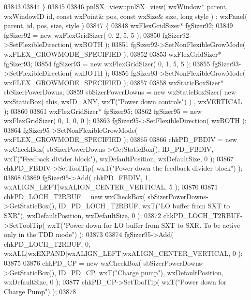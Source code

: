 \begin{DoxyCode}
03843     
03844 \}
03845 
03846 pnlSX_view::pnlSX_view( wxWindow* parent, wxWindowID \textcolor{keywordtype}{id}, \textcolor{keyword}{const} wxPoint& pos, \textcolor{keyword}{const} wxSize& 
      size, \textcolor{keywordtype}{long} style ) : wxPanel( parent, id, pos, size, style )
03847 \{
03848     wxFlexGridSizer* fgSizer92;
03849     fgSizer92 = \textcolor{keyword}{new} wxFlexGridSizer( 0, 2, 5, 5 );
03850     fgSizer92->SetFlexibleDirection( wxBOTH );
03851     fgSizer92->SetNonFlexibleGrowMode( wxFLEX\_GROWMODE\_SPECIFIED );
03852     
03853     wxFlexGridSizer* fgSizer93;
03854     fgSizer93 = \textcolor{keyword}{new} wxFlexGridSizer( 0, 1, 5, 5 );
03855     fgSizer93->SetFlexibleDirection( wxBOTH );
03856     fgSizer93->SetNonFlexibleGrowMode( wxFLEX\_GROWMODE\_SPECIFIED );
03857     
03858     wxStaticBoxSizer* sbSizerPowerDowns;
03859     sbSizerPowerDowns = \textcolor{keyword}{new} wxStaticBoxSizer( \textcolor{keyword}{new} wxStaticBox( \textcolor{keyword}{this}, wxID\_ANY, wxT(\textcolor{stringliteral}{"Power down controls"}) )
      , wxVERTICAL );
03860     
03861     wxFlexGridSizer* fgSizer95;
03862     fgSizer95 = \textcolor{keyword}{new} wxFlexGridSizer( 0, 1, 0, 0 );
03863     fgSizer95->SetFlexibleDirection( wxBOTH );
03864     fgSizer95->SetNonFlexibleGrowMode( wxFLEX\_GROWMODE\_SPECIFIED );
03865     
03866     chkPD_FBDIV = \textcolor{keyword}{new} wxCheckBox( sbSizerPowerDowns->GetStaticBox(), ID_PD_FBDIV, wxT(\textcolor{stringliteral}{"Feedback divider
       block"}), wxDefaultPosition, wxDefaultSize, 0 );
03867     chkPD_FBDIV->SetToolTip( wxT(\textcolor{stringliteral}{"Power down the feedback divider block"}) );
03868     
03869     fgSizer95->Add( chkPD_FBDIV, 1, wxALIGN\_LEFT|wxALIGN\_CENTER\_VERTICAL, 5 );
03870     
03871     chkPD_LOCH_T2RBUF = \textcolor{keyword}{new} wxCheckBox( sbSizerPowerDowns->GetStaticBox(), 
      ID_PD_LOCH_T2RBUF, wxT(\textcolor{stringliteral}{"LO buffer from SXT to SXR"}), wxDefaultPosition, wxDefaultSize, 0 );
03872     chkPD_LOCH_T2RBUF->SetToolTip( wxT(\textcolor{stringliteral}{"Power down for LO buffer from SXT to SXR. To be active only in the
       TDD mode"}) );
03873     
03874     fgSizer95->Add( chkPD_LOCH_T2RBUF, 0, wxALL|wxEXPAND|wxALIGN\_LEFT|wxALIGN\_CENTER\_VERTICAL, 0 );
03875     
03876     chkPD_CP = \textcolor{keyword}{new} wxCheckBox( sbSizerPowerDowns->GetStaticBox(), ID_PD_CP, wxT(\textcolor{stringliteral}{"Charge pump"}), 
      wxDefaultPosition, wxDefaultSize, 0 );
03877     chkPD_CP->SetToolTip( wxT(\textcolor{stringliteral}{"Power down for Charge Pump"}) );
03878     

\end{DoxyCode}

